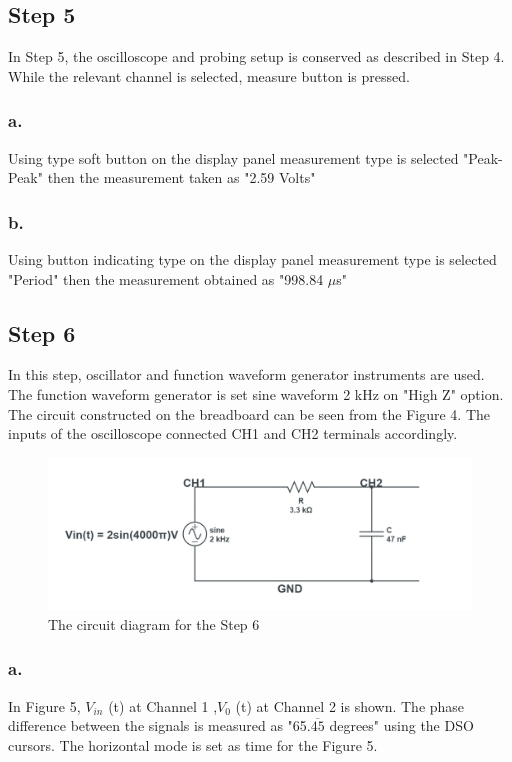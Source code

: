 \documentclass[letterpaper,12pt]{article}
\begin{document}
\subsection{Step 5}
In Step 5, the oscilloscope and probing setup is conserved as described in Step 4. While the relevant channel is selected, measure button is pressed.
\subsubsection{a.}
Using type soft  button on the display panel measurement type is selected "Peak-Peak" then the measurement taken as "2.59 Volts"
\subsubsection{b.}
Using button indicating type on the display panel measurement type is selected "Period" then the measurement obtained as "998.84 \(\mu\)s"
\subsection{Step 6}
In this step, oscillator and function waveform generator instruments are used. The function waveform generator is set sine waveform 2 kHz on "High Z" option. The circuit constructed on the breadboard can be seen from the Figure 4. The inputs of the oscilloscope connected CH1 and CH2 terminals accordingly.
\begin{figure}[!ht]
	\caption{The circuit diagram for the Step 6}
	\centering
	\includegraphics[width=1\textwidth]{6circuit.png}
\end{figure}

\subsubsection{a.}
In Figure 5, \( V_{in}\) (t) at Channel 1 ,\( V_0 \) (t) at Channel 2 is shown. The phase difference between the signals is measured as "65.\(\overline{45}\)  degrees" using the DSO cursors. The horizontal mode is set as time for the Figure 5.
\end{document}
